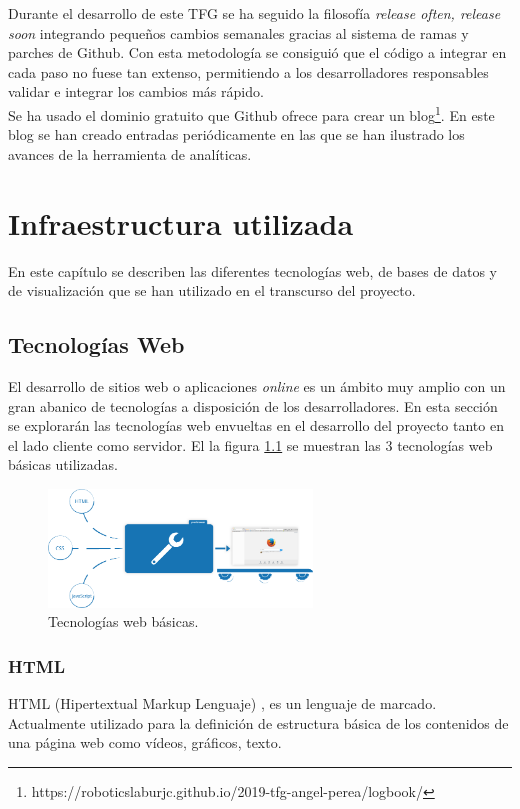 \documentclass[a4paper, 12pt]{book}
\begin{document}
		Durante el desarrollo de este TFG se ha seguido la filosofía \textit{release often, release soon} integrando pequeños cambios semanales gracias al sistema de ramas y parches de Github. Con esta metodología se consiguió que el código a integrar en cada paso no fuese tan extenso, permitiendo a los desarrolladores responsables validar e integrar los cambios más rápido.\\
		
		Se ha usado el dominio gratuito que Github ofrece para crear un blog\footnote{https://roboticslaburjc.github.io/2019-tfg-angel-perea/logbook/}. En este blog se han creado entradas periódicamente en las que se han ilustrado los avances de la herramienta de analíticas.  
		

		
	\cleardoublepage 
	\chapter{Infraestructura utilizada} 
	\label{chap:infraestructura_utilizada} 
		En este capítulo se describen las diferentes tecnologías web, de bases de datos y de visualización que se han utilizado en el transcurso del proyecto.
		
	\section{Tecnologías Web} 
	\label{sec:tecnologias_web} 
		El desarrollo de sitios web o aplicaciones \textit{online} es un ámbito muy amplio con un gran abanico de tecnologías a disposición de los desarrolladores. En esta sección se explorarán las tecnologías web envueltas en el desarrollo del proyecto tanto en el lado cliente como servidor. El la figura \ref{fig:HTML_CSS_JS} se muestran las 3 tecnologías web básicas utilizadas.
		
		\begin{figure}[H]
			\centering
			\includegraphics[width=7cm, keepaspectratio]{img/html_css_js.png}
			\caption{Tecnologías web básicas.}
			\label{fig:HTML_CSS_JS}
		\end{figure}
	
	\subsection{HTML}
	\label{subsec:html}
		HTML (Hipertextual Markup Lenguaje) \cite{HTML}, es un lenguaje de marcado. Actualmente utilizado para la definición de  estructura básica de los contenidos de una página web como vídeos, gráficos, texto. \\
		
\end{document}
